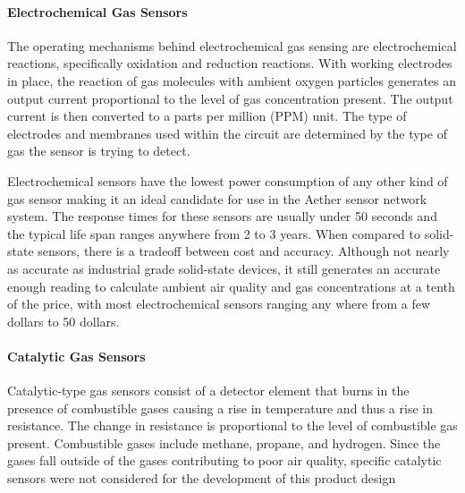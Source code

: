 \paragraph{Electrochemical Gas Sensors}
The operating mechanisms behind electrochemical gas sensing are electrochemical reactions, specifically oxidation and reduction reactions. With working electrodes in place, the reaction of gas molecules with ambient oxygen particles generates an output current proportional to the level of gas concentration present. The output current is then converted to a parts per million (PPM) unit. The type of electrodes and membranes used within the circuit are determined by the type of gas the sensor is trying to detect. 

Electrochemical sensors have the lowest power consumption of any other kind of gas sensor making it an ideal candidate for use in the Aether sensor network system. The response times for these sensors are usually under 50 seconds and the typical life span ranges anywhere from 2 to 3 years. When compared to solid-state sensors, there is a tradeoff between cost and accuracy. Although not nearly as accurate as industrial grade solid-state devices, it still generates an accurate enough reading to calculate ambient air quality and gas concentrations at a tenth of the price, with most electrochemical sensors ranging any where from a few dollars to 50 dollars. 
	
\paragraph{Catalytic Gas Sensors}
Catalytic-type gas sensors consist of a detector element that burns in the presence of combustible gases causing a rise in temperature and thus a rise in resistance. The change in resistance is proportional to the level of  combustible gas present. Combustible gases include methane, propane, and hydrogen. Since the gases fall outside of the gases contributing to poor air quality, specific catalytic sensors were not considered for the development of this product design




